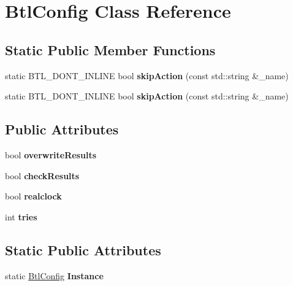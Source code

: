 \hypertarget{class_btl_config}{}\section{Btl\+Config Class Reference}
\label{class_btl_config}
\subsection*{Static Public Member Functions}
\begin{DoxyCompactItemize}
\item 
\mbox{\label{class_btl_config_aa1184fa46feaaf4b78ee67142966b869}} 
static B\+T\+L\+\_\+\+D\+O\+N\+T\+\_\+\+I\+N\+L\+I\+NE bool {\bfseries skip\+Action} (const std\+::string \&\+\_\+name)
\item 
\mbox{\label{class_btl_config_aa1184fa46feaaf4b78ee67142966b869}} 
static B\+T\+L\+\_\+\+D\+O\+N\+T\+\_\+\+I\+N\+L\+I\+NE bool {\bfseries skip\+Action} (const std\+::string \&\+\_\+name)
\end{DoxyCompactItemize}
\subsection*{Public Attributes}
\begin{DoxyCompactItemize}
\item 
\mbox{\label{class_btl_config_a879ee3ae42514ed1ee845048b0239855}} 
bool {\bfseries overwrite\+Results}
\item 
\mbox{\label{class_btl_config_a983932ef30a202ac0664a04ea06052f1}} 
bool {\bfseries check\+Results}
\item 
\mbox{\label{class_btl_config_a995e940c6c657d66e05eb1110012c1db}} 
bool {\bfseries realclock}
\item 
\mbox{\label{class_btl_config_a7e51190d2b85da32d669aa6c229b7aef}} 
int {\bfseries tries}
\end{DoxyCompactItemize}
\subsection*{Static Public Attributes}
\begin{DoxyCompactItemize}
\item 
\mbox{\label{class_btl_config_a62f7763794b00f0946b81d4262b2e4e0}} 
static \hyperlink{class_btl_config}{Btl\+Config} {\bfseries Instance}
\end{DoxyCompactItemize}
